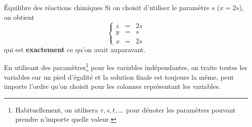 \documentclass[french]{beamer}
\begin{document}
\begin{frame}{Équilibre des réactions chimiques}
Si on choisit d'utiliser le paramètre $s$ ($x = 2s$),
on obtient
\[
\left\{ \begin{matrix}
z &=& 2s \\
y &=& s \\
x &=& 2s
\end{matrix}
\right.
\]
qui est \textbf{exactement} ce qu'on avait auparavant.
\vfill

En utilisant des paramètres\footnote{Habituellement, on utilisera $r, s, t, \ldots$ pour dénoter les paramètres pouvant prendre n'importe quelle valeur.} pour les variables indépendantes, on traite toutes les variables sur
un pied d'égalité et la solution finale est toujours
la même, peut importe l'ordre qu'on choisit pour les
colonnes représentant les variables.
\end{frame}
\end{document}
